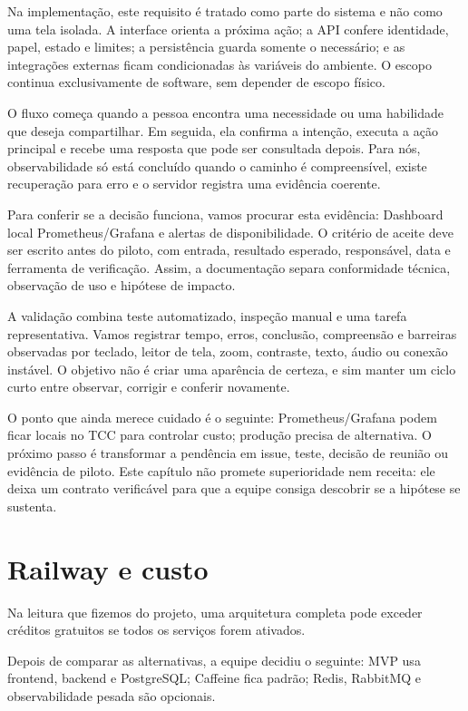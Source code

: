 \documentclass[12pt,oneside,a4paper,article]{abntex2}
\begin{document}
Na implementação, este requisito é tratado como parte do sistema e não como uma tela isolada. A interface orienta a próxima ação; a API confere identidade, papel, estado e limites; a persistência guarda somente o necessário; e as integrações externas ficam condicionadas às variáveis do ambiente. O escopo continua exclusivamente de software, sem depender de escopo físico.

O fluxo começa quando a pessoa encontra uma necessidade ou uma habilidade que deseja compartilhar. Em seguida, ela confirma a intenção, executa a ação principal e recebe uma resposta que pode ser consultada depois. Para nós, observabilidade só está concluído quando o caminho é compreensível, existe recuperação para erro e o servidor registra uma evidência coerente.

Para conferir se a decisão funciona, vamos procurar esta evidência: Dashboard local Prometheus/Grafana e alertas de disponibilidade. O critério de aceite deve ser escrito antes do piloto, com entrada, resultado esperado, responsável, data e ferramenta de verificação. Assim, a documentação separa conformidade técnica, observação de uso e hipótese de impacto.

A validação combina teste automatizado, inspeção manual e uma tarefa representativa. Vamos registrar tempo, erros, conclusão, compreensão e barreiras observadas por teclado, leitor de tela, zoom, contraste, texto, áudio ou conexão instável. O objetivo não é criar uma aparência de certeza, e sim manter um ciclo curto entre observar, corrigir e conferir novamente.

O ponto que ainda merece cuidado é o seguinte: Prometheus/Grafana podem ficar locais no TCC para controlar custo; produção precisa de alternativa. O próximo passo é transformar a pendência em issue, teste, decisão de reunião ou evidência de piloto. Este capítulo não promete superioridade nem receita: ele deixa um contrato verificável para que a equipe consiga descobrir se a hipótese se sustenta.

\section{Railway e custo}
Na leitura que fizemos do projeto, uma arquitetura completa pode exceder créditos gratuitos se todos os serviços forem ativados.

Depois de comparar as alternativas, a equipe decidiu o seguinte: MVP usa frontend, backend e PostgreSQL; Caffeine fica padrão; Redis, RabbitMQ e observabilidade pesada são opcionais.
\end{document}
